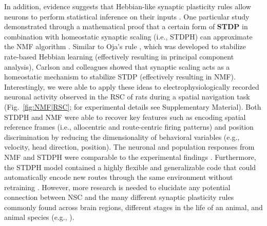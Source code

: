 In addition, evidence suggests that Hebbian-like synaptic plasticity rules
allow neurons to perform statistical inference on their inputs
\cite{Nessler2009,Carlson2013,MorenoBoteDrugowitsch2015,Oja1982}.
One particular study demonstrated through a mathematical proof
that a certain form of \textbf{\ac{STDP}} in combination with 
homeostatic synaptic scaling (i.e., \ac{STDPH})
can approximate the \ac{NMF} algorithm
\cite{Carlson2013}.
Similar to Oja's rule \cite{Oja1982}, which was developed to stabilize 
rate-based Hebbian learning
(effectively resulting in principal component analysis),
Carlson and colleagues showed that synaptic scaling acts as a 
homeostatic mechanism to stabilize \ac{STDP}
(effectively resulting in \ac{NMF}).
Interestingly, we were able to apply these ideas to 
electrophysiologically recorded neuronal activity observed in the \ac{RSC}
of rats during a spatial navigation task (Fig.~\ref{fig:NMF|RSC}; for experimental details see Supplementary Material). Both \ac{STDPH} and \ac{NMF} were able to recover key  features such as encoding spatial reference frames (i.e., allocentric and route-centric firing patterns) and position discrimination by reducing the dimensionality of behavioral variables (e.g., velocity, head direction, position).
The neuronal and population responses from NMF and STDPH were comparable to the experimental findings \cite{AlexanderNitz2015}.
Furthermore, the \ac{STDPH} model contained a highly flexible and generalizable code
that could automatically encode new routes through the same environment
without retraining \cite{Rounds2018}.
However, more research is needed to elucidate any potential connection 
between \ac{NSC} and the many different synaptic plasticity rules 
commonly found across brain regions,
different stages in the life of an animal, and animal species
(e.g., \cite{Froemke2010,BCM1982}).


